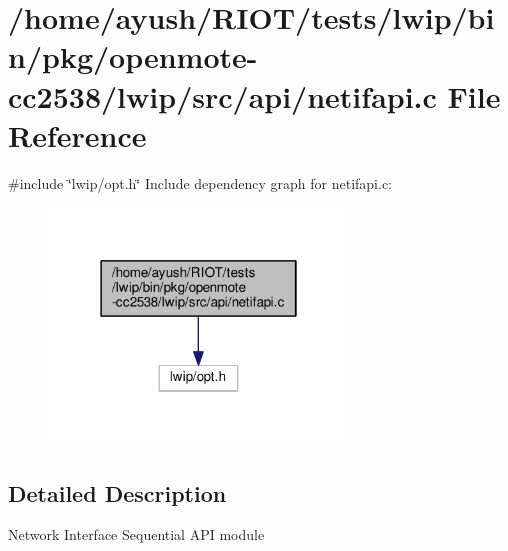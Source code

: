 \hypertarget{openmote-cc2538_2lwip_2src_2api_2netifapi_8c}{}\section{/home/ayush/\+R\+I\+O\+T/tests/lwip/bin/pkg/openmote-\/cc2538/lwip/src/api/netifapi.c File Reference}
\label{openmote-cc2538_2lwip_2src_2api_2netifapi_8c}
{\ttfamily \#include \char`\"{}lwip/opt.\+h\char`\"{}}\newline
Include dependency graph for netifapi.\+c\+:
\nopagebreak
\begin{figure}[H]
\begin{center}
\leavevmode
\includegraphics[width=226pt]{openmote-cc2538_2lwip_2src_2api_2netifapi_8c__incl}
\end{center}
\end{figure}


\subsection{Detailed Description}
Network Interface Sequential A\+PI module 